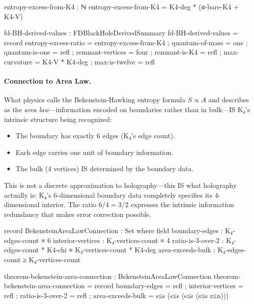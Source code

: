 \documentclass[11pt,a4paper]{book}
\begin{document}
\begin{code}
  entropy-excess-from-K4 : ℕ
  entropy-excess-from-K4 = K4-deg * (α-bare-K4 + K4-V)

  fd-BH-derived-values : FDBlackHoleDerivedSummary
  fd-BH-derived-values = record
    { entropy-excess-ratio = entropy-excess-from-K4
    ; quantum-of-mass = one
    ; quantum-is-one = refl
    ; remnant-vertices = four
    ; remnant-is-K4 = refl
    ; max-curvature = K4-V * K4-deg
    ; max-is-twelve = refl
    }
\end{code}

\paragraph{Connection to Area Law.}

What physics calls the Bekenstein-Hawking entropy formula $S \propto A$ and describes as the \emph{area law}—information encoded on boundaries rather than in bulk—IS K₄'s intrinsic structure being recognized:

\begin{itemize}
\item The boundary has exactly 6 edges (K₄'s edge count).
\item Each edge carries one unit of boundary information.
\item The bulk (4 vertices) IS determined by the boundary data.
\end{itemize}

This is not a discrete approximation to holography—this IS what holography actually is: K₄'s 6-dimensional boundary data completely specifies its 4-dimensional interior. The ratio $6/4 = 3/2$ expresses the intrinsic information redundancy that makes error correction possible.

\begin{code}
record BekensteinAreaLawConnection : Set where
  field
    boundary-edges     : K₄-edges-count ≡ 6
    interior-vertices  : K₄-vertices-count ≡ 4
    ratio-is-3-over-2  : K₄-edges-count * K4-chi ≡ K₄-vertices-count * K4-deg
    area-exceeds-bulk  : K₄-edges-count ≥ K₄-vertices-count

theorem-bekenstein-area-connection : BekensteinAreaLawConnection
theorem-bekenstein-area-connection = record
  { boundary-edges = refl
  ; interior-vertices = refl
  ; ratio-is-3-over-2 = refl
  ; area-exceeds-bulk = s≤s (s≤s (s≤s (s≤s z≤n)))
  }
\end{code}
  
\end{document}
